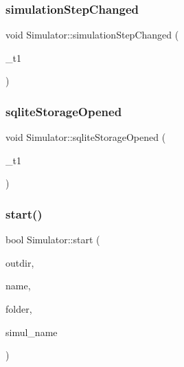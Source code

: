 \subsubsection{\texorpdfstring{simulationStepChanged}{simulationStepChanged}}
{\footnotesize\ttfamily void Simulator\+::simulation\+Step\+Changed (\begin{DoxyParamCaption}\item[{int}]{\+\_\+t1 }\end{DoxyParamCaption})\hspace{0.3cm}{\ttfamily [signal]}}

\mbox{\label{class_simulator_acd0f25e166cedfd96ec737b4375f7cc3}} 
\subsubsection{\texorpdfstring{sqliteStorageOpened}{sqliteStorageOpened}}
{\footnotesize\ttfamily void Simulator\+::sqlite\+Storage\+Opened (\begin{DoxyParamCaption}\item[{Q\+String}]{\+\_\+t1 }\end{DoxyParamCaption})\hspace{0.3cm}{\ttfamily [signal]}}

\mbox{\label{class_simulator_a6e5e3aa8ca2fffcc4fee463767c710c9}} 
\subsubsection{\texorpdfstring{start()}{start()}}
{\footnotesize\ttfamily bool Simulator\+::start (\begin{DoxyParamCaption}\item[{Q\+String}]{outdir,  }\item[{Q\+String}]{name,  }\item[{Q\+String}]{folder,  }\item[{Q\+String}]{simul\+\_\+name }\end{DoxyParamCaption})}

\mbox{\label{class_simulator_a77be9f7ec64264d49c239fc3d5be2ef0}} 
